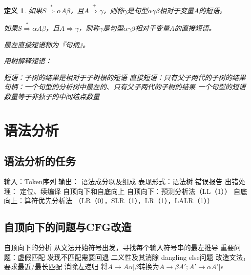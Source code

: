 \documentclass[oneside]{ctexbook}
\newtheorem{definition}{定义}[section]
\begin{document}
\begin{definition}
    如果$S \overset{*}\Rightarrow \alpha A \beta$，且$A \overset{+}\Rightarrow \gamma$，则称$\gamma$是句型$\alpha \gamma \beta$相对于变量$A$的短语。

    如果$S \overset{*}\Rightarrow \alpha A \beta$，且$A \Rightarrow \gamma$，则称$\gamma$是句型$\alpha \gamma \beta$相对于变量$A$的直接短语。

    最左直接短语称为『句柄』。

    用树解释短语：
    \begin{outline}
        \1 短语：子树的结果是相对于子树根的短语
        \1 直接短语：只有父子两代的子树的结果
        \1 句柄：一个句型的分析树中最左的、只有父子两代的子树的结果
        \1 一个句型的短语数量等于非独子的中间结点数量
    \end{outline}
\end{definition}

\chapter{语法分析}
\section{语法分析的任务}
\begin{outline}
    \1 输入：Token序列
    \1 输出：
        \2 语法成分以及组成
        \2 表现形式：语法树
        \2 错误报告
    \1 出错处理：
        \2 定位、续编译
    \1 自顶向下和自底向上
        \2 自顶向下：预测分析法（LL（1））
        \2 自底向上：算符优先分析法 （LR（0），SLR（1），LR（1），LALR（1））
\end{outline}
\section{自顶向下的问题与CFG改造}
\begin{outline}
\1 自顶向下的分析
    \2 从文法开始符号出发，寻找每个输入符号串的最左推导
\1 重要问题：虚假匹配
    \2 发现不匹配需要回退
\1 二义性及其消除
    \2 dangling else问题
    \2 改造文法，要求最近/最长匹配
\1 消除左递归
    \2 将$A \to A\alpha | \beta$转换为$A \to \beta A'; A' \to \alpha A' | \epsilon$
\end{outline}
\end{document}
